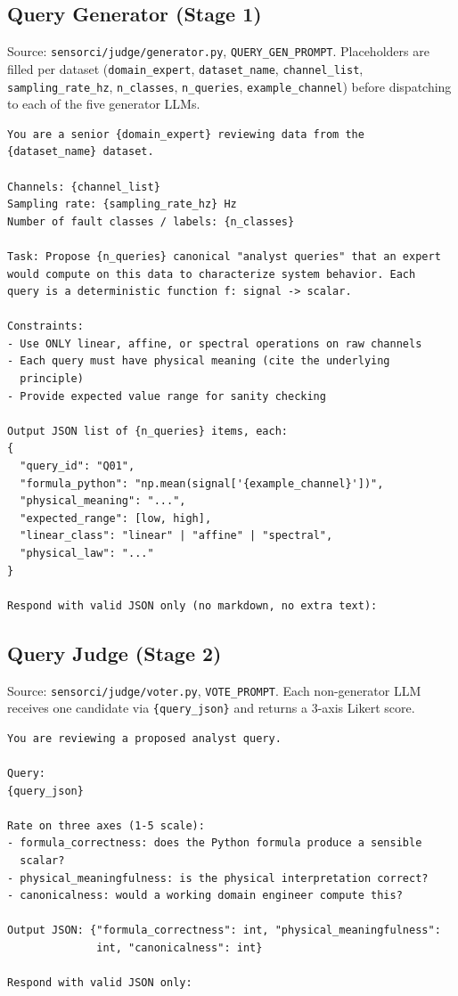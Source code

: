 \documentclass{article}
\theoremstyle{remark}
\begin{document}
\subsection{Query Generator (Stage 1)}
Source: \texttt{sensorci/judge/generator.py}, \texttt{QUERY\_GEN\_PROMPT}. Placeholders are filled per dataset (\texttt{domain\_expert}, \texttt{dataset\_name}, \texttt{channel\_list}, \texttt{sampling\_rate\_hz}, \texttt{n\_classes}, \texttt{n\_queries}, \texttt{example\_channel}) before dispatching to each of the five generator LLMs.
\begin{verbatim}
You are a senior {domain_expert} reviewing data from the
{dataset_name} dataset.

Channels: {channel_list}
Sampling rate: {sampling_rate_hz} Hz
Number of fault classes / labels: {n_classes}

Task: Propose {n_queries} canonical "analyst queries" that an expert
would compute on this data to characterize system behavior. Each
query is a deterministic function f: signal -> scalar.

Constraints:
- Use ONLY linear, affine, or spectral operations on raw channels
- Each query must have physical meaning (cite the underlying
  principle)
- Provide expected value range for sanity checking

Output JSON list of {n_queries} items, each:
{
  "query_id": "Q01",
  "formula_python": "np.mean(signal['{example_channel}'])",
  "physical_meaning": "...",
  "expected_range": [low, high],
  "linear_class": "linear" | "affine" | "spectral",
  "physical_law": "..."
}

Respond with valid JSON only (no markdown, no extra text):
\end{verbatim}

\subsection{Query Judge (Stage 2)}
Source: \texttt{sensorci/judge/voter.py}, \texttt{VOTE\_PROMPT}. Each non-generator LLM receives one candidate via \texttt{\{query\_json\}} and returns a 3-axis Likert score.
\begin{verbatim}
You are reviewing a proposed analyst query.

Query:
{query_json}

Rate on three axes (1-5 scale):
- formula_correctness: does the Python formula produce a sensible
  scalar?
- physical_meaningfulness: is the physical interpretation correct?
- canonicalness: would a working domain engineer compute this?

Output JSON: {"formula_correctness": int, "physical_meaningfulness":
              int, "canonicalness": int}

Respond with valid JSON only:
\end{verbatim}
\end{document}

